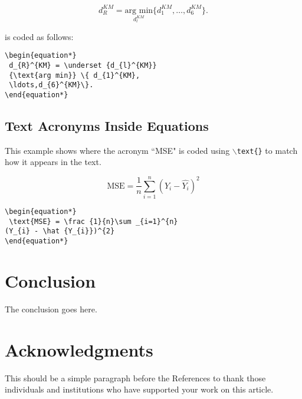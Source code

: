 \documentclass[lettersize,journal]{IEEEtran}
\begin{document}
\begin{equation*} 
  d_{R}^{KM} = \underset {d_{l}^{KM}} {\text{arg min}} \{ d_{1}^{KM},\ldots,d_{6}^{KM}\}.
\end{equation*}

\noindent is coded as follows:
\begin{verbatim}
\begin{equation*} 
 d_{R}^{KM} = \underset {d_{l}^{KM}} 
 {\text{arg min}} \{ d_{1}^{KM},
 \ldots,d_{6}^{KM}\}.
\end{equation*}
\end{verbatim}

\subsection{ Text Acronyms Inside Equations}
This example shows where the acronym ``MSE" is coded using $\backslash${\tt{text\{\}}} to match how it appears in the text.

\begin{equation*}
 \text{MSE} = \frac {1}{n}\sum _{i=1}^{n}(Y_{i} - \hat {Y_{i}})^{2}
\end{equation*}

\begin{verbatim}
\begin{equation*}
 \text{MSE} = \frac {1}{n}\sum _{i=1}^{n}
(Y_{i} - \hat {Y_{i}})^{2}
\end{equation*}
\end{verbatim}

\section{Conclusion}
The conclusion goes here.


\section*{Acknowledgments}
This should be a simple paragraph before the References to thank those individuals and institutions who have supported your work on this article.






\end{document}

